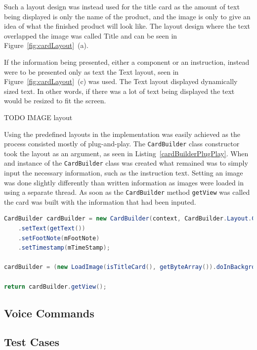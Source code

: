 Such a layout design was instead used for the title card as the amount of text being displayed is only the name of the product, and the image is only to give an idea of what the finished product will look like. The layout design where the text overlapped the image was called Title and can be seen in Figure~\ref{fig:cardLayout}~(a).

If the information being presented, either a component or an instruction, instead were to be presented only as text the Text layout, seen in Figure~\ref{fig:cardLayout}~(c) was used. The Text layout displayed dynamically sized text. In other words, if there was a lot of text being displayed the text would be resized to fit the screen.

TODO IMAGE layout

Using the predefined layouts in the implementation was easily achieved as the process consisted mostly of plug-and-play. The \texttt{CardBuilder} class constructor took the layout as an argument, as seen in Listing~\ref{cardBuilderPlugPlay}. When and instance of the \texttt{CardBuilder} class was created what remained was to simply input the necessary information, such as the instruction text. Setting an image was done slightly differently than written information as images were loaded in using a separate thread. As soon as the \texttt{CardBuilder} method \texttt{getView} was called the card was built with the information that had been inputed.

\begin{lstlisting}[language=Java, caption={Initialisation of the CardBuilder class}, label=cardBuilderPlugPlay]
CardBuilder cardBuilder = new CardBuilder(context, CardBuilder.Layout.COLUMNS)
	.setText(getText())
	.setFootNote(mFootNote)
	.setTimestamp(mTimeStamp);

cardBuilder = (new LoadImage(isTitleCard(), getByteArray()).doInBackground(cardBuilder));

return cardBuilder.getView();
\end{lstlisting}


\subsection{Voice Commands}


\subsection{Test Cases}


